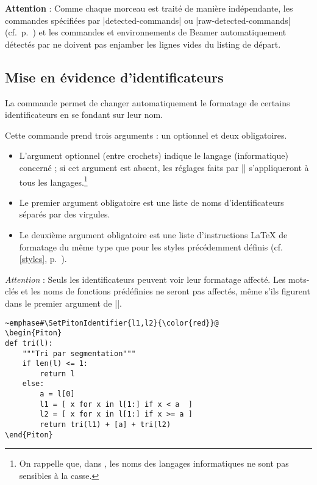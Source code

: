 \documentclass[dvipsnames,svgnames]{article}
\begin{document}
\bigskip
\textbf{Attention} : Comme chaque morceau est traité de manière indépendante, les
commandes spécifiées par |detected-commands| ou |raw-detected-commands|
(cf.~p.~\pageref{detected-commands}) et les commandes et environnements de Beamer
automatiquement détectés par  ne doivent pas enjamber les lignes vides du
listing de départ.



\bigskip
\subsection{Mise en évidence d'identificateurs}

\label{SetPitonIdentifier}

La commande  permet de changer automatiquement le
formatage de certains identificateurs en se fondant sur leur nom.

\smallskip
Cette commande prend trois arguments : un optionnel et deux obligatoires.

\begin{itemize}
\item L'argument optionnel (entre crochets) indique le langage (informatique) concerné ;
si cet argument est absent, les réglages faits par |\SetPitonIdentifier| s'appliqueront à
tous les langages.\footnote{On rappelle que, dans , les noms des langages
  informatiques ne sont pas sensibles à la casse.}

\item Le premier argument obligatoire est une liste de noms d'identificateurs séparés par
des virgules.

\item Le deuxième argument obligatoire est une liste d'instructions LaTeX de formatage du
même type que pour les styles précédemment définis (cf. \ref{styles},
p.~\pageref{styles}).


\end{itemize}

\emph{Attention} : Seuls les identificateurs peuvent voir leur formatage affecté. Les
mots-clés et les noms de fonctions prédéfinies ne seront pas affectés, même s'ils figurent
dans le premier argument de |\SetPitonIdentifier|.

\begin{Verbatim}
~emphase#\SetPitonIdentifier{l1,l2}{\color{red}}@
\begin{Piton}
def tri(l):
    """Tri par segmentation"""
    if len(l) <= 1:
        return l
    else:
        a = l[0]
        l1 = [ x for x in l[1:] if x < a  ]
        l2 = [ x for x in l[1:] if x >= a ]
        return tri(l1) + [a] + tri(l2)
\end{Piton}
\end{Verbatim}
\end{document}
